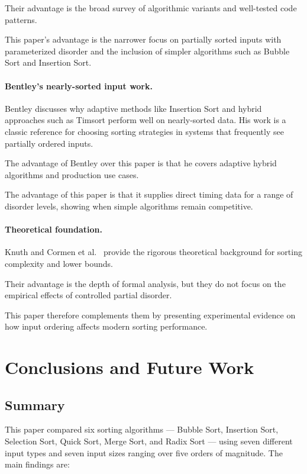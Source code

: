 \documentclass[12pt,a4paper]{article}
\theoremstyle{definition}
\begin{document}
Their advantage is the broad survey of algorithmic variants and well-tested code patterns.

This paper's advantage is the narrower focus on partially sorted inputs with parameterized disorder and the inclusion of simpler algorithms such as Bubble Sort and Insertion Sort.

\paragraph{Bentley's nearly-sorted input work.}
Bentley \cite{bentley1999} discusses why adaptive methods like Insertion Sort and hybrid approaches such as Timsort perform well on nearly-sorted data. His work is a classic reference for choosing sorting strategies in systems that frequently see partially ordered inputs.

The advantage of Bentley over this paper is that he covers adaptive hybrid algorithms and production use cases.

The advantage of this paper is that it supplies direct timing data for a range of disorder levels, showing when simple algorithms remain competitive.

\paragraph{Theoretical foundation.}
Knuth \cite{knuth1998} and Cormen et al.\ \cite{cormen2022} provide the rigorous theoretical background for sorting complexity and lower bounds.

Their advantage is the depth of formal analysis, but they do not focus on the empirical effects of controlled partial disorder.

This paper therefore complements them by presenting experimental evidence on how input ordering affects modern sorting performance.

\section{Conclusions and Future Work}
\label{sec:conclusions}

\subsection{Summary}

This paper compared six sorting algorithms --- Bubble Sort, Insertion Sort, Selection Sort, Quick Sort, Merge Sort, and Radix Sort --- using seven different input types and seven input sizes ranging over five orders of magnitude. The main findings are:
\end{document}
